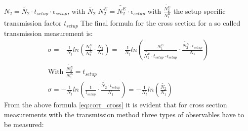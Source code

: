 $N_{2} = \tilde{N_{2}} \cdot t_{setup}\cdot \epsilon_{setup}$, with $\tilde{N_{2}}$\newline
$N_{2}^E = \tilde{N_{2}^E} \cdot \epsilon_{setup}$ with $\frac{\tilde{N_{2}^E}}{N_{1}^E}$ the setup specific transmission factor $t_{setup}$ \newline
\newline
The final formula for the cross section for a so called transmission measurement is:
\begin{equation}
	\begin{split}
\sigma = -\frac{1}{N_t} ln(\frac{N_{1}^E}{N_{2}^E} \cdot \frac{N_2}{N_1}) = -\frac{1}{N_t} ln(\frac{N_{1}^E}{\tilde{N_{2}^E} \cdot t_{setup}\cdot \epsilon_{setup}} \cdot \frac{\tilde{N_{2}^E} \cdot \epsilon_{setup}}{N_1}) \\
\text{With $\frac{\tilde{N_{2}^E}}{N_{1}^E} = t_{setup}$} \\
\sigma = -\frac{1}{N_t} ln(\frac{1}{t_{setup}} \cdot \frac{\tilde{N_{2}} \cdot t_{setup}}{N_1}) = -\frac{1}{N_t} ln(\frac{\tilde{N_{2}}}{N_1})
\label{eq:corr_cross}
	\end{split}
\end{equation}
From the above formula \ref{eq:corr_cross} it is evident that for cross section measurements with the transmission method three types of observables have to be measured:\newline
